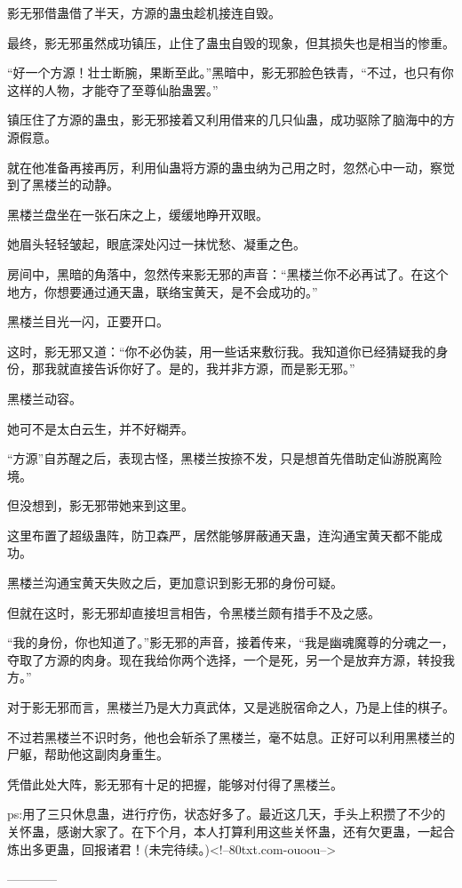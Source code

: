 \begin{this_body}
影无邪借蛊借了半天，方源的蛊虫趁机接连自毁。

最终，影无邪虽然成功镇压，止住了蛊虫自毁的现象，但其损失也是相当的惨重。

“好一个方源！壮士断腕，果断至此。”黑暗中，影无邪脸色铁青，“不过，也只有你这样的人物，才能夺了至尊仙胎蛊罢。”

镇压住了方源的蛊虫，影无邪接着又利用借来的几只仙蛊，成功驱除了脑海中的方源假意。

就在他准备再接再厉，利用仙蛊将方源的蛊虫纳为己用之时，忽然心中一动，察觉到了黑楼兰的动静。

黑楼兰盘坐在一张石床之上，缓缓地睁开双眼。

她眉头轻轻皱起，眼底深处闪过一抹忧愁、凝重之色。

房间中，黑暗的角落中，忽然传来影无邪的声音：“黑楼兰你不必再试了。在这个地方，你想要通过通天蛊，联络宝黄天，是不会成功的。”

黑楼兰目光一闪，正要开口。

这时，影无邪又道：“你不必伪装，用一些话来敷衍我。我知道你已经猜疑我的身份，那我就直接告诉你好了。是的，我并非方源，而是影无邪。”

黑楼兰动容。

她可不是太白云生，并不好糊弄。

“方源”自苏醒之后，表现古怪，黑楼兰按捺不发，只是想首先借助定仙游脱离险境。

但没想到，影无邪带她来到这里。

这里布置了超级蛊阵，防卫森严，居然能够屏蔽通天蛊，连沟通宝黄天都不能成功。

黑楼兰沟通宝黄天失败之后，更加意识到影无邪的身份可疑。

但就在这时，影无邪却直接坦言相告，令黑楼兰颇有措手不及之感。

“我的身份，你也知道了。”影无邪的声音，接着传来，“我是幽魂魔尊的分魂之一，夺取了方源的肉身。现在我给你两个选择，一个是死，另一个是放弃方源，转投我方。”

对于影无邪而言，黑楼兰乃是大力真武体，又是逃脱宿命之人，乃是上佳的棋子。

不过若黑楼兰不识时务，他也会斩杀了黑楼兰，毫不姑息。正好可以利用黑楼兰的尸躯，帮助他这副肉身重生。

凭借此处大阵，影无邪有十足的把握，能够对付得了黑楼兰。

ps:用了三只休息蛊，进行疗伤，状态好多了。最近这几天，手头上积攒了不少的关怀蛊，感谢大家了。在下个月，本人打算利用这些关怀蛊，还有欠更蛊，一起合炼出多更蛊，回报诸君！(未完待续。)<!--80txt.com-ouoou-->

------------

\end{this_body}

